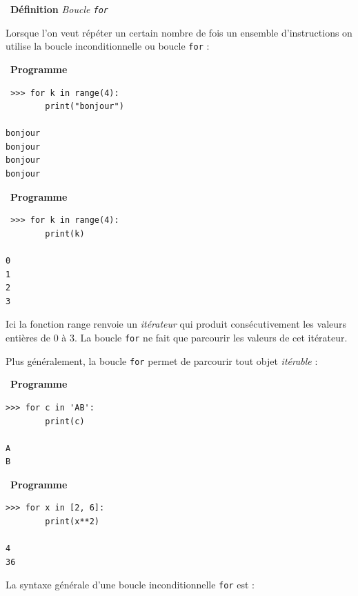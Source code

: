 \documentclass[a4paper, french, 12pt]{article}  %
\newcommand\bcpython{\texttt{[image: /home/fjunier/Maths/python-logo.png]}}
\newcounter{def}
\newenvironment{definition}[1]
{\par \medskip   \addtocounter{def}{1} \noindent  
\begin{bclogo}[arrondi =0.1,  ombre = true, barre=none, logo=\bcbook, marge=4]{~\textbf{Définition} \textbf{\thedef} {\itshape #1} }  \par}
{
\end{bclogo}
 \par \bigskip }
\newcounter{prog}
\newenvironment{programme}[1]
{\par \medskip   \addtocounter{prog}{1} \noindent  
 \begin {bclogo}[noborder = true, barre=zigzag,logo=\bcpython, marge=4] {~\textbf{Programme} \textbf{\theprog} {\itshape #1} }  \par  \bigskip}
{
\end{bclogo}
 \par \bigskip }
\begin{document}
\begin{definition}{Boucle \texttt{for}}
Lorsque l'on veut répéter un certain nombre de fois un ensemble d'instructions on utilise la boucle inconditionnelle ou boucle \texttt{for} : 
 
\begin{minipage}{0.45\linewidth}
 \begin{programme}{}
 \begin{lstlisting}
 >>> for k in range(4):
		print("bonjour")
	
bonjour
bonjour
bonjour
bonjour
 \end{lstlisting}
 \end{programme}
 \end{minipage}
\hfill\begin{minipage}{0.45\linewidth}
 \begin{programme}{}
 \begin{lstlisting}
 >>> for k in range(4):
		print(k)
	
0
1
2
3
 \end{lstlisting}
 \end{programme}
 \end{minipage}

 Ici la fonction range renvoie un \emph{itérateur} qui produit consécutivement les valeurs entières de 0 à 3. La boucle \lstinline{for} ne fait que parcourir les valeurs de cet itérateur.  
 
 Plus généralement, la boucle \lstinline{for} permet de parcourir tout objet \emph{itérable} : 
 
\begin{minipage}{0.4\linewidth} %
\begin{programme}{}
{\small
\begin{lstlisting}
>>> for c in 'AB':
		print(c)
	
A
B
\end{lstlisting}
}
\end{programme}
\end{minipage}
\hfill 
\begin{minipage}{0.6\linewidth} 
\begin{programme}{}
{\small
\begin{lstlisting}
>>> for x in [2, 6]:
		print(x**2)
	
4
36
\end{lstlisting}
}
\end{programme}
\end{minipage}

La syntaxe générale d'une boucle inconditionnelle \lstinline{for} est :


\end{definition}
\end{document}
